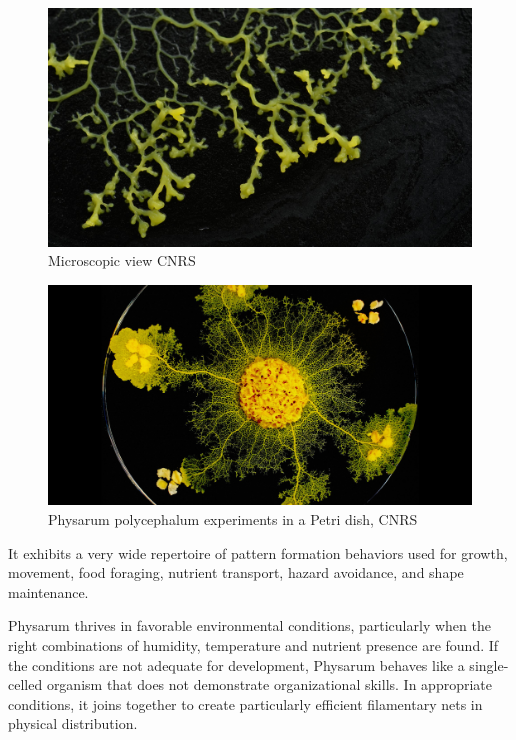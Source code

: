 \begin{figure}
  \centering
    \includegraphics[width=1\textwidth]{2311_dsc104}%
    
  \caption{Microscopic view \textcopyright CNRS}
  \label{fig:2311dsc104}
\end{figure}

\begin{figure}
  \centering
    \includegraphics[width=1\textwidth]{Physarum_CNRS_2880x1500}%
    
  \caption{Physarum polycephalum experiments in a Petri dish, \textcopyright CNRS}
  \label{fig:PhysarumCNRS2880x1500}
\end{figure}




\par
It exhibits a very wide repertoire of pattern formation behaviors used for growth, movement, food foraging, nutrient transport, hazard avoidance, and shape maintenance. 

\par
Physarum thrives in favorable environmental conditions, particularly when the right combinations of humidity, temperature and nutrient presence are found. If the conditions are not adequate for development, Physarum behaves like a single-celled organism that does not demonstrate organizational skills. In appropriate conditions, it joins together to create particularly efficient filamentary nets in physical distribution.

